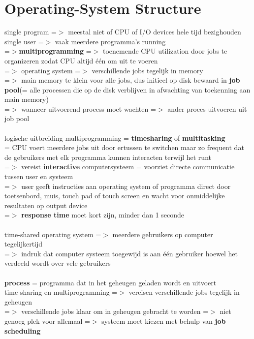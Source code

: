 \documentclass{report}
\begin{document}
\section{Operating-System Structure}
single program =$>$ meestal niet of CPU of I/O devices hele tijd bezighouden
\\single user =$>$ vaak meerdere programma's running
\\=$>$\textbf{multiprogramming} =$>$ toenemende CPU utilization door jobs te organizeren zodat CPU altijd \'e\'en om uit te voeren
\\=$>$ operating system =$>$ verschillende jobs tegelijk in memory
\\=$>$ main memory te klein voor alle jobs, dus initieel op disk bewaard in \textbf{job pool}(= alle processen die op de disk verblijven in afwachting van toekenning aan main memory)
\\=$>$ wanneer uitvoerend process moet wachten =$>$ ander proces uitvoeren uit job pool
\\
\\logische uitbreiding multiprogramming = \textbf{timesharing} of \textbf{multitasking}
\\= CPU voert meerdere jobs uit door ertussen te switchen maar zo frequent dat de gebruikers met elk programma kunnen interacten terwijl het runt
\\=$>$ vereist \textbf{interactive} computersysteem = voorziet directe communicatie tussen user en systeem
\\=$>$ user geeft instructies aan operating system of programma direct door toetsenbord, muis, touch pad of touch screen en wacht voor onmiddelijke resultaten op output device
\\=$>$ \textbf{response time} moet kort zijn, minder dan 1 seconde
\\
\\time-shared operating system =$>$ meerdere gebruikers op computer tegelijkertijd
\\=$>$ indruk dat computer systeem toegewijd is aan \'e\'en gebruiker hoewel het verdeeld wordt over vele gebruikers
\\
\\\textbf{process} = programma dat in het geheugen geladen wordt en uitvoert
\\time sharing en multiprogramming =$>$ vereisen verschillende jobs tegelijk in geheugen 
\\=$>$ verschillende jobs klaar om in geheugen gebracht te worden =$>$ niet genoeg plek voor allemaal =$>$ systeem moet kiezen met behulp van \textbf{job scheduling}
\end{document}
